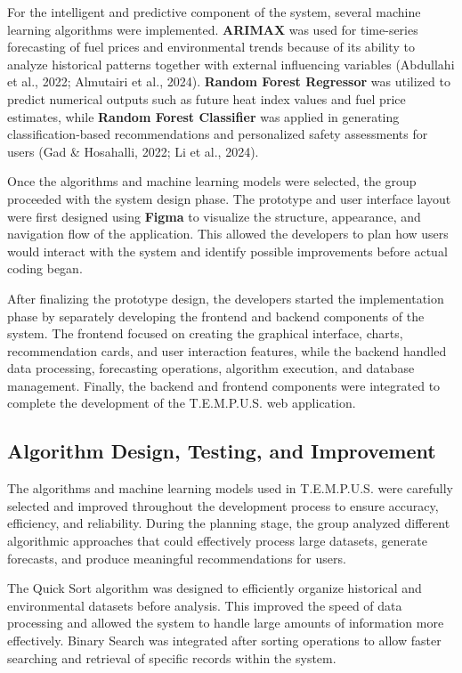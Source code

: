 \documentclass[12pt]{article}
\begin{document}
For the intelligent and predictive component of the system, several machine learning algorithms were implemented. \textbf{ARIMAX} was used for time-series forecasting of fuel prices and environmental trends because of its ability to analyze historical patterns together with external influencing variables (Abdullahi et al., 2022; Almutairi et al., 2024). \textbf{Random Forest Regressor} was utilized to predict numerical outputs such as future heat index values and fuel price estimates, while \textbf{Random Forest Classifier} was applied in generating classification-based recommendations and personalized safety assessments for users (Gad \& Hosahalli, 2022; Li et al., 2024).

Once the algorithms and machine learning models were selected, the group proceeded with the system design phase. The prototype and user interface layout were first designed using \textbf{Figma} to visualize the structure, appearance, and navigation flow of the application. This allowed the developers to plan how users would interact with the system and identify possible improvements before actual coding began.

After finalizing the prototype design, the developers started the implementation phase by separately developing the frontend and backend components of the system. The frontend focused on creating the graphical interface, charts, recommendation cards, and user interaction features, while the backend handled data processing, forecasting operations, algorithm execution, and database management. Finally, the backend and frontend components were integrated to complete the development of the T.E.M.P.U.S. web application.

\subsection{Algorithm Design, Testing, and Improvement}

The algorithms and machine learning models used in T.E.M.P.U.S. were carefully selected and improved throughout the development process to ensure accuracy, efficiency, and reliability. During the planning stage, the group analyzed different algorithmic approaches that could effectively process large datasets, generate forecasts, and produce meaningful recommendations for users.

The Quick Sort algorithm was designed to efficiently organize historical and environmental datasets before analysis. This improved the speed of data processing and allowed the system to handle large amounts of information more effectively. Binary Search was integrated after sorting operations to allow faster searching and retrieval of specific records within the system.
\end{document}
